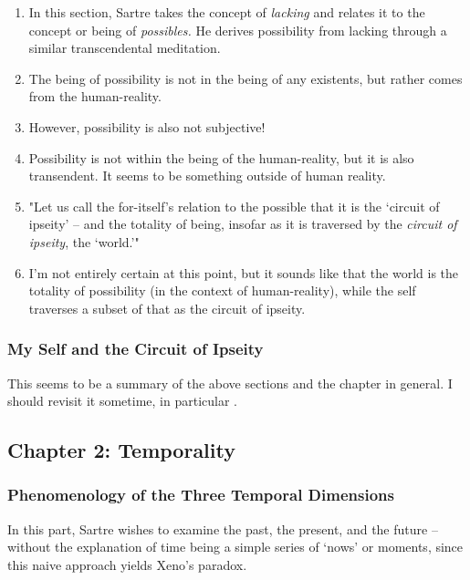 \begin{enumerate}
  \item In this section, Sartre takes the concept of \emph{lacking} and relates it to the concept or being of \emph{possibles.} He derives possibility from lacking through a similar transcendental meditation.
  \item The being of possibility is not in the being of any existents, but rather comes from the human-reality.
  \item However, possibility is also not subjective!
  \item Possibility is not within the being of the human-reality, but it is also transendent. It seems to be something outside of human reality. \autocite[158]{sartre}
  \item "Let us call the for-itself's relation to the possible that it is the `circuit of ipseity' -- and the totality of being, insofar as it is traversed by the \emph{circuit of ipseity}, the `world.'" \autocite[158]{sartre}
  \item I'm not entirely certain at this point, but it sounds like that the world is the totality of possibility (in the context of human-reality), while the self traverses a subset of that as the circuit of ipseity.
\end{enumerate}

\subsubsection{My Self and the Circuit of Ipseity}

This seems to be a summary of the above sections and the chapter in general. I should revisit it sometime, in particular \autocite[161]{sartre}.

\subsection{Chapter 2: Temporality}

\subsubsection{Phenomenology of the Three Temporal Dimensions}

In this part, Sartre wishes to examine the past, the present, and the future -- without the explanation of time being a simple series of `nows' or moments, since this naive approach yields Xeno's paradox.

